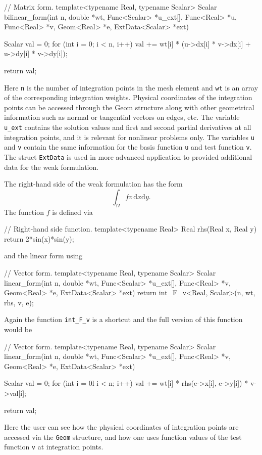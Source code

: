 \documentclass[final,3p,times,twocolumn]{elsarticle}
\begin{document}
\begin{code}
// Matrix form.
template<typename Real, typename Scalar>
Scalar bilinear_form(int n, double *wt, 
                     Func<Scalar> *u_ext[], 
                     Func<Real> *u, Func<Real> *v, 
                     Geom<Real> *e, 
                     ExtData<Scalar> *ext)
{
  Scalar val = 0;
  for (int i = 0; i < n, i++) {
    val += wt[i] * (u->dx[i] * v->dx[i] 
                    + u->dy[i] * v->dy[i]);
  }
  
  return val;
}
\end{code}
Here {\tt n} is the number of integration points in the mesh
element and {\tt wt} is an array of the corresponding integration
weights. Physical coordinates of the integration points can be 
accessed through the Geom structure along with other geometrical 
information such as normal or tangential vectors on edges, etc.
The variable {\tt u\_ext} contains the solution values and first and 
second partial derivatives at all integration points, and it is 
relevant for nonlinear problems only. The variables {\tt u} and 
{\tt v} contain the same information for the basis function {\tt u}
and test function {\tt v}. The struct {\tt ExtData} is used in 
more advanced application to provided additional data for the 
weak formulation.
 
The right-hand side of the weak formulation has the form 
$$
\int_{\Omega} fv\, \mbox{d}x\mbox{d}y.
$$
The function $f$ is defined via

\begin{code}
// Right-hand side function.
template<typename Real>
Real rhs(Real x, Real y)
{
  return 2*sin(x)*sin(y);
}
\end{code}
and the linear form using

\begin{code}
// Vector form.
template<typename Real, typename Scalar>
Scalar linear_form(int n, double *wt, 
                   Func<Scalar> *u_ext[], 
                   Func<Real> *v, Geom<Real> *e, 
                   ExtData<Scalar> *ext)
{
  return int_F_v<Real, Scalar>(n, wt, rhs, v, e);
}
\end{code}
Again the function {\tt int\_F\_v} is a shortcut and 
the full version of this function would be

\begin{code}
// Vector form.
template<typename Real, typename Scalar>
Scalar linear_form(int n, double *wt, 
                   Func<Scalar> *u_ext[], 
                   Func<Real> *v, Geom<Real> *e, 
                   ExtData<Scalar> *ext)
{
  Scalar val = 0;
  for (int i = 0l i < n; i++) {
    val += wt[i] * rhs(e->x[i], e->y[i]) * v->val[i];
  }

  return val;
}
\end{code}
Here the user can see how the physical coordinates of 
integration points are accessed via the {\tt Geom}
structure, and how one uses function values of the 
test function {\tt v} at integration points.
 
\end{document}
